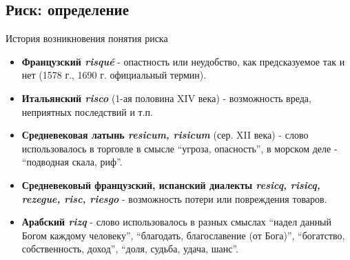 \documentclass[_fin_decisions_lectures.tex]{subfiles}
\begin{document}
\subsection{Риск: определение}
\begin{frame}[shrink=15]{История возникновения понятия риска}
\begin{itemize}[<+->]
\item
\textbf{Французский \textit{\foreignlanguage{french}{risqué}}} - опастность или неудобство, как предсказуемое так и нет (1578 г., 1690 г. официальный термин).
\item
\textbf{Итальянский \textit{risco}} (1-ая половина XIV века) - возможность вреда, неприятных последствий и т.п.

\item
\textbf{Средневековая латынь \textit{resicum, risicum}} (сер. XII века) - слово использовалось в торговле в смысле ``угроза, опасность'', в морском деле - ``подводная скала, риф''.

\item
\textbf{Средневековый французский, испанский диалекты \textit{resicq, risicq, rezegue, risc, riesgo}} - возможность потери или повреждения товаров.

\item
\textbf{Арабский \textit{rizq }}- слово использовалось в разных смыслах ``надел данный Богом каждому человеку'', ``благодать, благославение (от Бога)'', ``богатство, собственность, доход'', ``доля, судьба, удача, шанс''.

\end{itemize}

\end{frame}
\end{document}
